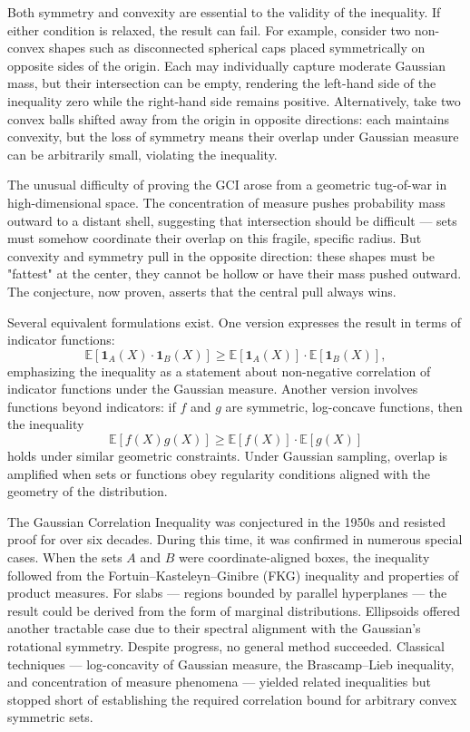 Both symmetry and convexity are essential to the validity of the inequality. If either condition is relaxed, the result can fail. For example, consider two non-convex shapes such as disconnected spherical caps placed symmetrically on opposite sides of the origin. Each may individually capture moderate Gaussian mass, but their intersection can be empty, rendering the left-hand side of the inequality zero while the right-hand side remains positive. Alternatively, take two convex balls shifted away from the origin in opposite directions: each maintains convexity, but the loss of symmetry means their overlap under Gaussian measure can be arbitrarily small, violating the inequality.

The unusual difficulty of proving the GCI arose from a geometric tug-of-war in high-dimensional space. The concentration of measure pushes probability mass outward to a distant shell, suggesting that intersection should be difficult — sets must somehow coordinate their overlap on this fragile, specific radius. But convexity and symmetry pull in the opposite direction: these shapes must be "fattest" at the center, they cannot be hollow or have their mass pushed outward. The conjecture, now proven, asserts that the central pull always wins.

Several equivalent formulations exist. One version expresses the result in terms of indicator functions:
\[
\mathbb{E}[\mathbf{1}_A(X) \cdot \mathbf{1}_B(X)] \geq \mathbb{E}[\mathbf{1}_A(X)] \cdot \mathbb{E}[\mathbf{1}_B(X)],
\]
emphasizing the inequality as a statement about non-negative correlation of indicator functions under the Gaussian measure. Another version involves functions beyond indicators: if \( f \) and \( g \) are symmetric, log-concave functions, then the inequality
\[
\mathbb{E}[f(X)g(X)] \geq \mathbb{E}[f(X)] \cdot \mathbb{E}[g(X)]
\]
holds under similar geometric constraints. Under Gaussian sampling, overlap is amplified when sets or functions obey regularity conditions aligned with the geometry of the distribution.

The Gaussian Correlation Inequality was conjectured in the 1950s and resisted proof for over six decades. During this time, it was confirmed in numerous special cases. When the sets \( A \) and \( B \) were coordinate-aligned boxes, the inequality followed from the Fortuin–Kasteleyn–Ginibre (FKG) inequality and properties of product measures. For slabs — regions bounded by parallel hyperplanes — the result could be derived from the form of marginal distributions. Ellipsoids offered another tractable case due to their spectral alignment with the Gaussian's rotational symmetry. Despite progress, no general method succeeded. Classical techniques — log-concavity of Gaussian measure, the Brascamp–Lieb inequality, and concentration of measure phenomena — yielded related inequalities but stopped short of establishing the required correlation bound for arbitrary convex symmetric sets.

